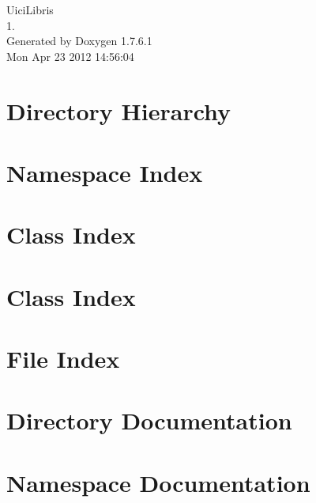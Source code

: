 \documentclass[a4paper]{book}
\begin{document}
\hypersetup{pageanchor=false,citecolor=blue}
\begin{titlepage}
\vspace*{7cm}
\begin{center}
{\Large \-Uici\-Libris \\[1ex]\large 1. }\\
\vspace*{1cm}
{\large \-Generated by Doxygen 1.7.6.1}\\
\vspace*{0.5cm}
{\small Mon Apr 23 2012 14:56:04}\\
\end{center}
\end{titlepage}
\clearemptydoublepage
{}
\tableofcontents
\clearemptydoublepage
{}
\hypersetup{pageanchor=true,citecolor=blue}
\chapter{\-Directory \-Hierarchy}

\chapter{\-Namespace \-Index}

\chapter{\-Class \-Index}

\chapter{\-Class \-Index}

\chapter{\-File \-Index}

\chapter{\-Directory \-Documentation}



\chapter{\-Namespace \-Documentation}



























\end{document}
